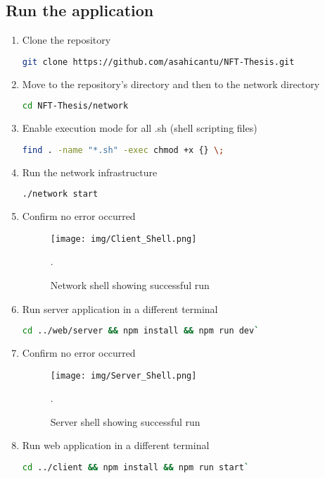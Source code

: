 \subsection{Run the application}
\begin{enumerate}
    \item Clone the repository
    \begin{lstlisting}[language=sh]
    git clone https://github.com/asahicantu/NFT-Thesis.git
    \end{lstlisting}
    \item Move to the repository's directory and then to the network directory
    \begin{lstlisting}[language=sh]
    cd NFT-Thesis/network
    \end{lstlisting}
    \item Enable execution mode for all .sh (shell scripting files)
    \begin{lstlisting}[language=sh]
    find . -name "*.sh" -exec chmod +x {} \;
    \end{lstlisting}
    \item Run the network infrastructure
    \begin{lstlisting}[language=sh]
    ./network start
    \end{lstlisting}
    \item Confirm no error occurred
     \begin{figure}[!h]
        \centering
        \texttt{[image: img/Client\_Shell.png]}
        \caption{Network shell showing successful run}.
        \label{fig:Network_Shell}
    \end{figure}
    \item Run server application in a different terminal
    \begin{lstlisting}[language=sh]
    cd ../web/server && npm install && npm run dev`
    \end{lstlisting}
    \item Confirm no error occurred
     \begin{figure}[!h]
        \centering
        \texttt{[image: img/Server\_Shell.png]}
        \caption{Server shell showing successful run}.
        \label{fig:Server_Shell}
    \end{figure}
    \item Run web application in a different terminal
    \begin{lstlisting}[language=sh]
    cd ../client && npm install && npm run start`
    \end{lstlisting}

\end{enumerate}
